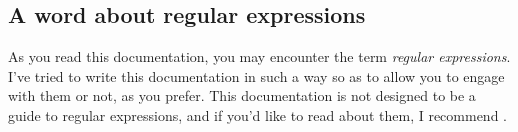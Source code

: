 \subsection{A word about regular expressions}
 As you read this documentation, you may encounter the term \emph{regular expressions}.
 I've tried to write this documentation in such a way so as to allow you to engage with
 them or not, as you prefer. This documentation is not designed to be a guide to regular
 expressions, and if you'd like to read about them, I recommend \cite{masteringregexp}.
